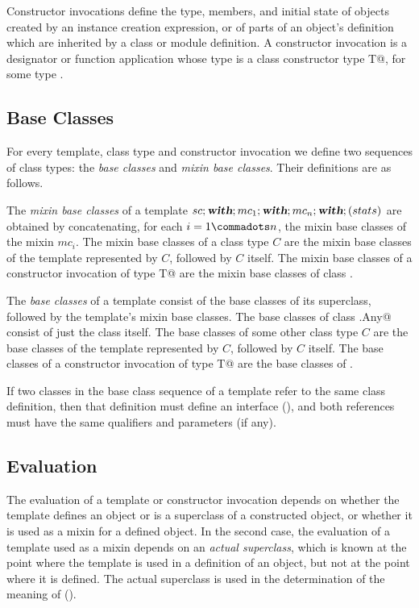 \documentclass[11pt]{report}
\begin{document}
\begin{itemize}
Constructor invocations define the type, members, and initial state of
objects created by an instance creation expression, or of parts of an
object's definition which are inherited by a class or module
definition. A constructor invocation is a designator or function
application whose type is a class constructor type \verb@class T@, for
some type \verb@T@.

\subsection{Base Classes}
\label{sec:base-classes}

For every template, class type and constructor invocation we define two
sequences of class types: the {\em base classes} and {\em mixin base
classes}. Their definitions are as follows.

The {\em mixin base classes} of a template
$sc;\mbox{\sl\bfseries with};mc_1;\mbox{\sl\bfseries with};mc_n;\mbox{\sl\bfseries with};(stats)$ are obtained by
concatenating, for each $i = 1 \commadots n$, the mixin base classes
of the mixin $mc_i$. The mixin base classes of a class type $C$ are
the mixin base classes of the template represented by $C$, followed by
$C$ itself. The mixin base classes of a constructor invocation of type
\verb@class T@ are the mixin base classes of class \verb@T@.

The {\em base classes} of a template consist of the base classes of
its superclass, followed by the template's mixin base classes.  The
base classes of class \verb@scala.Any@ consist of just the
class itself. The base classes of some other class type $C$ are the
base classes of the template represented by $C$, followed by $C$
itself.  The base classes of a constructor invocation of type \verb@class T@
are the base classes of \verb@T@.

If two classes in the base class sequence of a template refer to the
same class definition, then that definition must define an interface
(), and both references must have the same
qualifiers and parameters (if any).

\subsection{Evaluation}

The evaluation of a template or constructor invocation depends on
whether the template defines an object or is a superclass of a
constructed object, or whether it is used as a mixin for a defined
object.  In the second case, the evaluation of a template used as a
mixin depends on an {\em actual superclass}, which is known at the
point where the template is used in a definition of an object, but not
at the point where it is defined. The actual superclass is used in the
determination of the meaning of \verb@super@ ().


\end{itemize}
\end{document}
